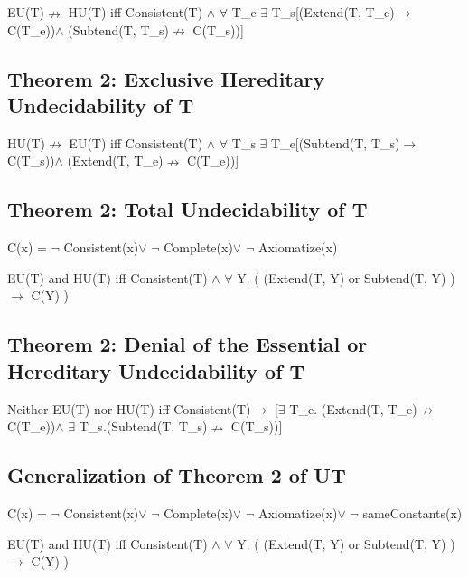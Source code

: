 EU(T)$\nrightarrow$ HU(T) iff Consistent(T) $\land$  $\forall$ T\_e $\exists$ T\_s{[}(Extend(T,
T\_e)$\to$ C(T\_e))$\land$ (Subtend(T, T\_s)$\nrightarrow$ C(T\_s)){]}

\hypertarget{theorem-2-exclusive-hereditary-undecidability-of-t}{%
\subsection{Theorem 2: Exclusive Hereditary Undecidability of
T}\label{theorem-2-exclusive-hereditary-undecidability-of-t}}

HU(T)$\nrightarrow$ EU(T) iff Consistent(T) $\land$  $\forall$ T\_s $\exists$ T\_e{[}(Subtend(T,
T\_s)$\to$ C(T\_s))$\land$ (Extend(T, T\_e)$\nrightarrow$ C(T\_e)){]}

\hypertarget{theorem-2-total-undecidability-of-t}{%
\subsection{Theorem 2: Total Undecidability of
T}\label{theorem-2-total-undecidability-of-t}}

C(x) = $\neg$ Consistent(x)$\lor$ $\neg$ Complete(x)$\lor$ $\neg$ Axiomatize(x)

EU(T) and HU(T) iff Consistent(T) $\land$  $\forall$ Y. ( (Extend(T, Y) or Subtend(T, Y)
) $\to$  C(Y) )

\hypertarget{theorem-2-denial-of-the-essential-or-hereditary-undecidability-of-t}{%
\subsection{Theorem 2: Denial of the Essential or Hereditary
Undecidability of
T}\label{theorem-2-denial-of-the-essential-or-hereditary-undecidability-of-t}}

Neither EU(T) nor HU(T) iff Consistent(T)$\to$ {[}$\exists$ T\_e. (Extend(T,
T\_e)$\nrightarrow$ C(T\_e))$\land$ $\exists$ T\_s.(Subtend(T, T\_s)$\nrightarrow$ C(T\_s)){]}

\hypertarget{generalization-of-theorem-2-of-ut}{%
\subsection{Generalization of Theorem 2 of
UT}\label{generalization-of-theorem-2-of-ut}}

C(x) = $\neg$ Consistent(x)$\lor$ $\neg$ Complete(x)$\lor$ $\neg$ Axiomatize(x)$\lor$ $\neg$ sameConstants(x)

EU(T) and HU(T) iff Consistent(T) $\land$  $\forall$ Y. ( (Extend(T, Y) or Subtend(T, Y)
) $\to$  C(Y) )


